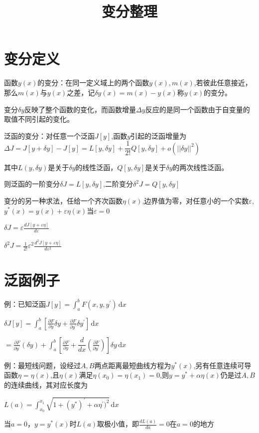 \documentclass{article}
\begin{document}
\title{变分整理}
\maketitle
\section{变分定义}
函数$y(x)$的变分：在同一定义域上的两个函数$y(x),m(x)$,若彼此任意接近，那么$m(x)$与$y(x)$之差，记$\delta y(x)=m(x)-y(x)$称$y(x)$的变分。

变分$\delta y$反映了整个函数的变化，而函数增量$ \Delta y $反应的是同一个函数由于自变量的取值不同引起的变化。

泛函的变分：对任意一个泛函$J[y]$,函数$y$引起的泛函增量为$\Delta J=J[y+\delta y]-J[y]=L[y,\delta y]+\dfrac{1}{2!}Q[y,\delta y]+o(||\delta y||^2)$

其中$L(y,\delta y)$是关于$\delta y$的线性泛函，$Q[y,\delta y]$是关于$\delta y$的两次线性泛函。

则泛函的一阶变分$\delta J=L[y,\delta y]$,二阶变分$\delta^2J=Q[y,\delta y]$

变分的另一种求法，任给一个齐次函数$\eta(x)$,边界值为零，对任意小的一个实数$\varepsilon$,$y^{*}(x)=y(x)+\varepsilon\eta(x)$当$\varepsilon=0$

$\delta J=\varepsilon\frac{dJ[y+\varepsilon\eta]}{d\varepsilon}$

$\delta^2 J=\frac{1}{2!}\varepsilon^2\frac{d^2J[y+\varepsilon\eta]}{d\varepsilon^2}$

\section{泛函例子}
例：已知泛函$J[y]=\int_{a}^{b}F(x,y,y^{'})\,\mathrm{d}x$

$ \delta J[y]=\int_{a}^{b}[\frac{\partial F}{\partial y}\delta y+\frac{\partial F}{\partial y^{'}}\delta y^{'}]\,\mathrm{d}x $

$=\frac{\partial F}{\partial y^{'}}(\delta y)+\int_{a}^{b}[\frac{\partial F}{\partial y}+\dfrac{d}{dx}(\frac{\partial F}{\partial y^{'}})]\delta y\,\mathrm{d}x $

例：最短线问题，设经过$A,B$两点距离最短曲线方程为$y^{*}(x)$,另有任意连续可导函数$\eta=\eta(x)$,且$\eta(x)$满足$\eta(x_{0})=\eta(x_{1})=0$,则$y=y^{*}+\alpha\eta(x)$仍是过$A,B$的连续曲线，其对应长度为

$L(a)=\int_{x_{0}}^{x_{1}}\sqrt{1+(y^{*})^{'}+\alpha\eta^{'})^2}\,\mathrm{d}x$

当$a=0$，$y=y^{*}(x)$时$L(a)$取极小值，即$\frac{dL(a)}{da}=0$在$a=0$的地方
\end{document}
